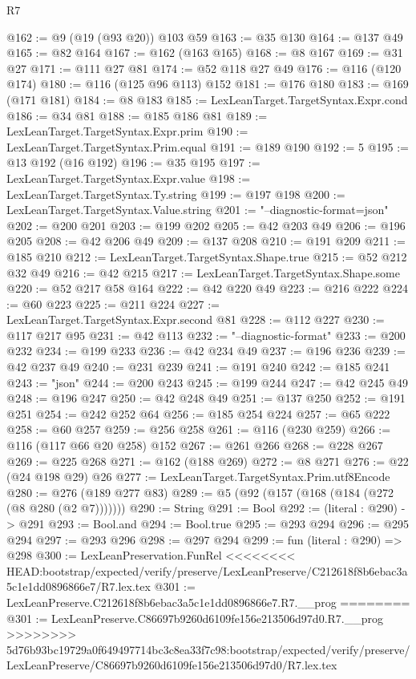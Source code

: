 \begin{lexlean}{R7}
\begin{coremodule}
{{{{{{{{{{{{{@162 := @9 (@19 (@93 @20)) @103 @59
@163 := @35 @130
@164 := @137 @49
@165 := @82 @164
@167 := @162 (@163 @165)
@168 := @8 @167
@169 := @31 @27
@171 := @111 @27 @81
@174 := @52 @118 @27 @49
@176 := @116 (@120 @174)
@180 := @116 (@125 @96 @113) @152
@181 := @176 @180
@183 := @169 (@171 @181)
@184 := @8 @183
@185 := LexLeanTarget.TargetSyntax.Expr.cond
@186 := @34 @81
@188 := @185 @186 @81
@189 := LexLeanTarget.TargetSyntax.Expr.prim
@190 := LexLeanTarget.TargetSyntax.Prim.equal
@191 := @189 @190
@192 := 5
@195 := @13 @192 (@16 @192)
@196 := @35 @195
@197 := LexLeanTarget.TargetSyntax.Expr.value
@198 := LexLeanTarget.TargetSyntax.Ty.string
@199 := @197 @198
@200 := LexLeanTarget.TargetSyntax.Value.string
@201 := "--diagnostic-format=json"
@202 := @200 @201
@203 := @199 @202
@205 := @42 @203 @49
@206 := @196 @205
@208 := @42 @206 @49
@209 := @137 @208
@210 := @191 @209
@211 := @185 @210
@212 := LexLeanTarget.TargetSyntax.Shape.true
@215 := @52 @212 @32 @49
@216 := @42 @215
@217 := LexLeanTarget.TargetSyntax.Shape.some
@220 := @52 @217 @58 @164
@222 := @42 @220 @49
@223 := @216 @222
@224 := @60 @223
@225 := @211 @224
@227 := LexLeanTarget.TargetSyntax.Expr.second @81
@228 := @112 @227
@230 := @117 @217 @95
@231 := @42 @113
@232 := "--diagnostic-format"
@233 := @200 @232
@234 := @199 @233
@236 := @42 @234 @49
@237 := @196 @236
@239 := @42 @237 @49
@240 := @231 @239
@241 := @191 @240
@242 := @185 @241
@243 := "json"
@244 := @200 @243
@245 := @199 @244
@247 := @42 @245 @49
@248 := @196 @247
@250 := @42 @248 @49
@251 := @137 @250
@252 := @191 @251
@254 := @242 @252 @64
@256 := @185 @254 @224
@257 := @65 @222
@258 := @60 @257
@259 := @256 @258
@261 := @116 (@230 @259)
@266 := @116 (@117 @66 @20 @258) @152
@267 := @261 @266
@268 := @228 @267
@269 := @225 @268
@271 := @162 (@188 @269)
@272 := @8 @271
@276 := @22 (@24 @198 @29) @26
@277 := LexLeanTarget.TargetSyntax.Prim.utf8Encode
@280 := @276 (@189 @277 @83)
@289 := @5 (@92 (@157 (@168 (@184 (@272 (@8 @280 (@2 @7)))))))
@290 := String
@291 := Bool
@292 := (literal : @290) -> @291
@293 := Bool.and
@294 := Bool.true
@295 := @293 @294
@296 := @295 @294
@297 := @293 @296
@298 := @297 @294
@299 := fun (literal : @290) => @298
@300 := LexLeanPreservation.FunRel
<<<<<<<< HEAD:bootstrap/expected/verify/preserve/LexLeanPreserve/C212618f8b6ebac3a5c1e1dd0896866e7/R7.lex.tex
@301 := LexLeanPreserve.C212618f8b6ebac3a5c1e1dd0896866e7.R7.__prog
========
@301 := LexLeanPreserve.C86697b9260d6109fe156e213506d97d0.R7.__prog
>>>>>>>> 5d76b93bc19729a0f649497714bc3c8ea33f7c98:bootstrap/expected/verify/preserve/LexLeanPreserve/C86697b9260d6109fe156e213506d97d0/R7.lex.tex
}}}}}}}}}}}}}
\end{coremodule}
\end{lexlean}
